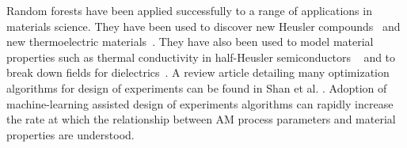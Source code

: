 Random forests have been applied successfully to a range of applications in materials science. They have been used to discover new Heusler compounds~\cite{Oliynyk2016} and new thermoelectric materials~\cite{Gaultois2016}. They have also been used to model material properties such as thermal conductivity in half-Heusler semiconductors ~\cite{Carrete2014} and to break down fields for dielectrics~\cite{Kim2016}.  A review article detailing many optimization algorithms for design of experiments can be found in Shan et al. \cite{Shan2010}. Adoption of machine-learning assisted design of experiments algorithms can rapidly increase the rate at which the relationship between AM process parameters and material properties are understood. 

